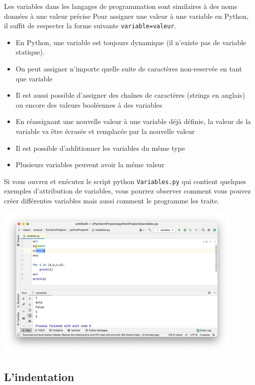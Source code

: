 Les variables dans les langages de programmation sont similaires à des noms données à une valeur précise
Pour assigner une valeur à une variable en Python, il suffit de respecter la forme suivante \lstinline{variable=valeur}.

\begin{conseil}
\begin{itemize}
	\item En Python, une variable est  toujours dynamique (il n'existe pas de variable statique).
	\item On peut assigner n'importe quelle suite de caractères non-reservée en tant que variable
	\item Il est aussi possible d'assigner des chaînes de caractères (strings en anglais) ou encore des valeurs booléennes à des variables
	\item En réassignant une nouvelle valeur à une variable déjà définie, la valeur de la variable va être écrasée et remplacée par la nouvelle valeur
	\item Il est possible d'additionner les variables du même type
	\item Plusieurs variables peuvent avoir la même valeur
\end{itemize}
\end{conseil}


Si vous ouvrez et exécutez le script python \lstinline{Variables.py} qui contient quelques exemples d'attribution de variables, vous pourrez observer comment vous pouvez créer différentes variables mais aussi comment le programme les traite.

\begin{center}
	\includegraphics[width=12cm]{6}	
\end{center}


\subsection{L'indentation}

